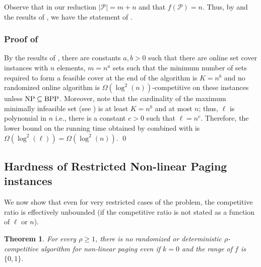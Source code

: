 \documentclass[11pt]{article}
\newcommand{\cP}{{\mathcal{P}}}
\newtheorem{lemma}[thm]{Lemma}
\newtheorem{theorem}[thm]{Theorem}
\begin{document}
Observe that in our reduction $|\cP| = m+n$ and that $f(\cP) = n$. Thus, by  and the results of \cite{alon2003online,korman2004use}, we have the statement of . %




\subsubsection*{Proof of }

By the results of \cite{korman2004use}, there are constants $a,b>0$ such that there are online set cover instances with $n$ elements, $m = n^a$ sets such that the minimum number of sets required to form a feasible cover at the end of the algorithm is $K = n^b$ and no randomized online algorithm is $\Omega(\log^2\left(n\right))$-competitive on these instances unless $\textnormal{NP}\subseteq \textnormal{BPP}$. Moreover, note that the cardinality of the maximum minimally infeasible set (see ) is at least $K = n^b$ and at most $n$; thus, $\ell$ is polynomial in $n$ i.e., there is a constant $c>0$ such that $\ell = n^c$. Therefore, the lower bound on the running time obtained by  combined with \cite{korman2004use} is $\Omega(\log^2\left(\ell\right)) = \Omega(\log^2\left(n\right))$. \qed


\subsection{Hardness of Restricted Non-linear Paging instances}
\label{sec:hardRestricted}

We now show that even for very restricted cases of the problem, the competitive ratio is effectively unbounded (if the competitive ratio is not stated as a function of $\ell$ or $n$). 

\begin{theorem}
\label{thm:HardnessRestricted}
For every $\rho \geq 1$, there is no randomized or deterministic $\rho$-competitive algorithm for \textnormal{non-linear paging} even if $k = 0$ and the range of $f$ is $\{0,1\}$.
\end{theorem}
\end{document}
